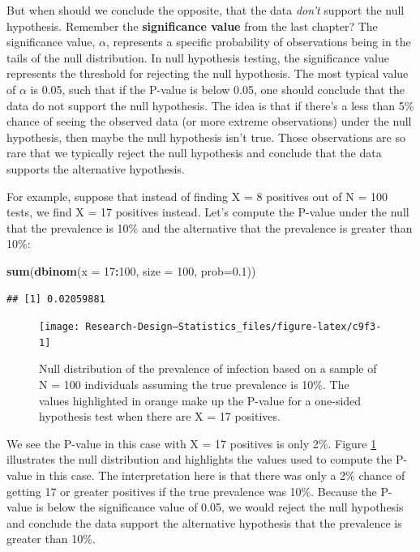 \documentclass[
]{book}
\newenvironment{Shaded}{\begin{snugshade}}{\end{snugshade}}
\newcommand{\AttributeTok}[1]{\textcolor[rgb]{0.13,0.29,0.53}{#1}}
\newcommand{\DecValTok}[1]{\textcolor[rgb]{0.00,0.00,0.81}{#1}}
\newcommand{\FloatTok}[1]{\textcolor[rgb]{0.00,0.00,0.81}{#1}}
\newcommand{\FunctionTok}[1]{\textcolor[rgb]{0.13,0.29,0.53}{\textbf{#1}}}
\newcommand{\NormalTok}[1]{#1}
\newcommand{\SpecialCharTok}[1]{\textcolor[rgb]{0.81,0.36,0.00}{\textbf{#1}}}
\begin{document}
But when should we conclude the opposite, that the data \emph{don't} support the null hypothesis. Remember the \textbf{significance value} from the last chapter? The significance value, \(\alpha\), represents a specific probability of observations being in the tails of the null distribution. In null hypothesis testing, the significance value represents the threshold for rejecting the null hypothesis. The most typical value of \(\alpha\) is 0.05, such that if the P-value is below 0.05, one should conclude that the data do not support the null hypothesis. The idea is that if there's a less than 5\% chance of seeing the observed data (or more extreme observations) under the null hypothesis, then maybe the null hypothesis isn't true. Those observations are so rare that we typically reject the null hypothesis and conclude that the data supports the alternative hypothesis.

For example, suppose that instead of finding X = 8 positives out of N = 100 tests, we find X = 17 positives instead. Let's compute the P-value under the null that the prevalence is 10\% and the alternative that the prevalence is greater than 10\%:

\begin{Shaded}
\begin{Highlighting}[]
\FunctionTok{sum}\NormalTok{(}\FunctionTok{dbinom}\NormalTok{(}\AttributeTok{x =} \DecValTok{17}\SpecialCharTok{:}\DecValTok{100}\NormalTok{, }\AttributeTok{size =} \DecValTok{100}\NormalTok{, }\AttributeTok{prob=}\FloatTok{0.1}\NormalTok{))}
\end{Highlighting}
\end{Shaded}

\begin{verbatim}
## [1] 0.02059881
\end{verbatim}

\begin{figure}

{\centering \texttt{[image: Research-Design---Statistics\_files/figure-latex/c9f3-1]} 

}

\caption{Null distribution of the prevalence of infection based on a sample of N = 100 individuals assuming the true prevalence is 10\%. The values highlighted in orange make up the P-value for a one-sided hypothesis test when there are X = 17 positives.}\label{fig:c9f3}
\end{figure}

We see the P-value in this case with X = 17 positives is only 2\%. Figure \ref{fig:c9f3} illustrates the null distribution and highlights the values used to compute the P-value in this case. The interpretation here is that there was only a 2\% chance of getting 17 or greater positives if the true prevalence was 10\%. Because the P-value is below the significance value of 0.05, we would reject the null hypothesis and conclude the data support the alternative hypothesis that the prevalence is greater than 10\%.
\end{document}
